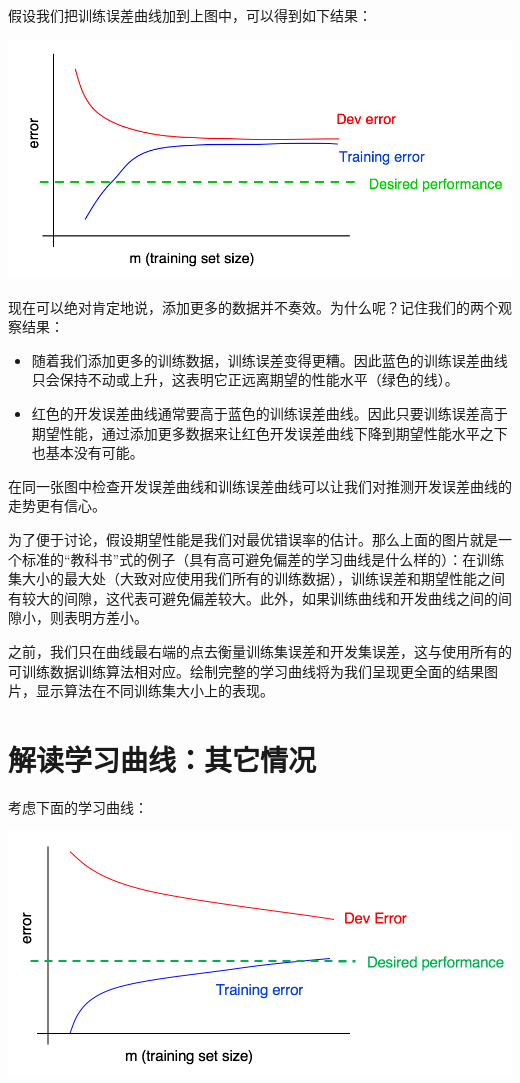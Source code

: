 假设我们把训练误差曲线加到上图中，可以得到如下结果：

\includegraphics{./img/ch30_02.jpg}

现在可以绝对肯定地说，添加更多的数据并不奏效。为什么呢？记住我们的两个观察结果：

\begin{itemize}
\tightlist
\item
  随着我们添加更多的训练数据，训练误差变得更糟。因此蓝色的训练误差曲线只会保持不动或上升，这表明它正远离期望的性能水平（绿色的线）。
\item
  红色的开发误差曲线通常要高于蓝色的训练误差曲线。因此只要训练误差高于期望性能，通过添加更多数据来让红色开发误差曲线下降到期望性能水平之下也基本没有可能。
\end{itemize}

在同一张图中检查开发误差曲线和训练误差曲线可以让我们对推测开发误差曲线的走势更有信心。

为了便于讨论，假设期望性能是我们对最优错误率的估计。那么上面的图片就是一个标准的``教科书''式的例子（具有高可避免偏差的学习曲线是什么样的）：在训练集大小的最大处（大致对应使用我们所有的训练数据），训练误差和期望性能之间有较大的间隙，这代表可避免偏差较大。此外，如果训练曲线和开发曲线之间的间隙小，则表明方差小。

之前，我们只在曲线最右端的点去衡量训练集误差和开发集误差，这与使用所有的可训练数据训练算法相对应。绘制完整的学习曲线将为我们呈现更全面的结果图片，显示算法在不同训练集大小上的表现。

\hypertarget{ux89e3ux8bfbux5b66ux4e60ux66f2ux7ebfux5176ux5b83ux60c5ux51b5}{%
\chapter{解读学习曲线：其它情况}\label{ux89e3ux8bfbux5b66ux4e60ux66f2ux7ebfux5176ux5b83ux60c5ux51b5}}

考虑下面的学习曲线：

\includegraphics{./img/ch31_01.jpg}

